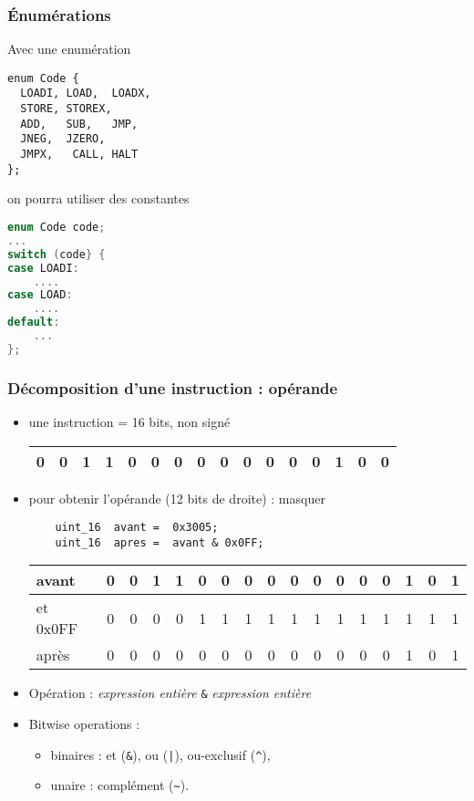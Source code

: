 \documentclass[]{beamer}
\begin{document}
\begin{frame}[containsverbatim]
\frametitle{Énumérations}
\begin{multicols}{2}
Avec une  \alert{enumération}
\begin{lstlisting}[langage=C, frame=single] 
enum Code {
  LOADI, LOAD,  LOADX,   
  STORE, STOREX,
  ADD,   SUB,   JMP,     
  JNEG,  JZERO,
  JMPX,   CALL, HALT
};
\end{lstlisting}
\break
on pourra utiliser des constantes
\begin{lstlisting}[frame=single, language=C]
enum Code code;
...
switch (code} {
case LOADI:
    ....
case LOAD:
    ....
default:
    ...
};
\end{lstlisting}
\end{multicols}
\end{frame}

\begin{frame}[containsverbatim]
\frametitle{Décomposition d'une instruction : opérande}

\begin{itemize}
\item une instruction = 16 bits, non signé
\begin{tabular}{|*{16}{c|}}
\hline
0 & 0 & 1 & 1 &
0 & 0 & 0 & 0 &
0 & 0&  0&  0&
0 & 1 & 0 & 0 \\
\hline
\end{tabular}
\item pour obtenir l'\alert{opérande} (12 bits de droite) : masquer
\begin{lstlisting}
    uint_16  avant =  0x3005;
    uint_16  apres =  avant & 0x0FF;
\end{lstlisting}
{\small
\begin{tabular}{l|*{16}{c|}}
\hline
avant & \alert{0} & \alert{0} & \alert{1} & \alert{1} &
0 & 0 & 0 & 0 &
0 & 0&  0&  0&
0 & 1 & 0 & 1 \\
\hline
et 0x0FF & \alert{0} & \alert{0} & \alert{0} & \alert{0} &
1 & 1 & 1 & 1 &
1 & 1 & 1 & 1 &
1 & 1 & 1 & 1 \\
\hline\hline
après & \alert{0} & \alert{0} & \alert{0} & \alert{0} &
0 & 0 & 0 & 0 &
0 & 0&  0&  0&
0 & 1 & 0 & 1 \\
\hline
\end{tabular}
}
\item Opération : 
 \emph{expression entière} \texttt{\&} \emph{expression entière}

\item \alert{Bitwise operations} : 
\begin{itemize}
\item binaires : 
et (\verb+&+), 
ou  (\verb+|+), 
ou-exclusif  (\verb+^+), 
\item unaire : 
complément (\verb+~+).
\end{itemize}
\end{itemize}
\end{frame}
\end{document}
